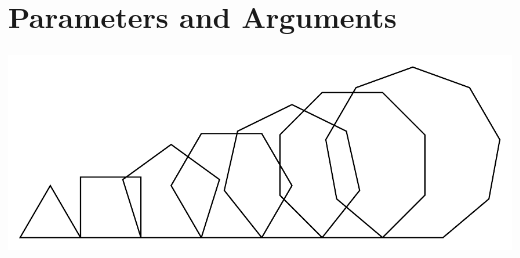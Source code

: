 \documentclass[a4paper,10pt,twoside]{book}
\begin{document}
    \sloppy
\fi

\chapter{Parameters and Arguments}\label{cha:parameters}


% 
% 
% 

\begin{center}
\includegraphics[width=0.85\linewidth]{ArgumentTitle}
\end{center}
\vspace*{1cm}
\end{document}
